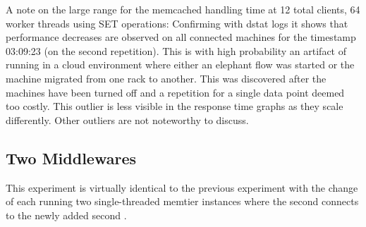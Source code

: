             A note on the large range for the memcached handling time at 12 total clients, 64 worker threads using SET
            operations: Confirming with dstat logs it shows that performance decreases are observed on all connected
            machines for the timestamp 03:09:23 (on the second repetition). This is with high probability an artifact of
            running in a cloud environment where either an elephant flow was started or the machine migrated from one
            rack to another. This was discovered after the machines have been turned off and a repetition for a single
            data point deemed too costly. This outlier is less visible in the response time graphs as they scale
            differently. Other outliers are not noteworthy to discuss.

    \subsection{Two Middlewares\label{subsec:3_two-middlewares}}

        This experiment is virtually identical to the previous experiment with the change of each \srv{} running two
        single-threaded memtier instances where the second connects to the newly added second \mw{}.

